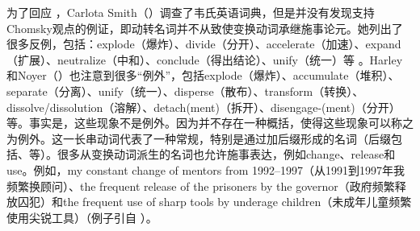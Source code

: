 \begin{exe}
\begin{xlist}[iv.]
\begin{exe}
\begin{xlist}[iv.]
为了回应 ，Carlota Smith（\citeyear{Smith72a-u}）调查了韦氏英语词典，但是并没有发现支持Chomsky观点的例证，即动转名词并不从致使变换动词承继施事论元。她列出了很多反例，包括：explode（爆炸）、divide（分开）、accelerate（加速）、expand（扩展）、neutralize（中和）、conclude（得出结论）、unify（统一）等 \citep[]{Smith72a-u}。Harley和Noyer（\citeyear{HN2000a}）也注意到很多“例外”，包括explode（爆炸）、accumulate（堆积）、separate（分离）、unify（统一）、disperse（散布）、transform（转换）、dissolve/dissolution（溶解）、detach(ment)（拆开）、disengage-(ment)（分开）等。事实是，这些现象不是例外。因为并不存在一种概括，使得这些现象可以称之为例外。这一长串动词代表了一种常规，特别是通过加后缀形成的名词（后缀包括、等）。很多从变换动词派生的名词也允许施事表达，例如change、release和use。例如，my constant change of mentors from 1992--1997（从1991到1997年我频繁换顾问）、the frequent release of the prisoners by the governor（政府频繁释放囚犯）和the frequent use of sharp tools by underage children（未成年儿童频繁使用尖锐工具）（例子引自 \citet[脚注\,13]{Borer2003a-u}）。   


\end{xlist}
\end{exe}
\end{xlist}
\end{exe}
